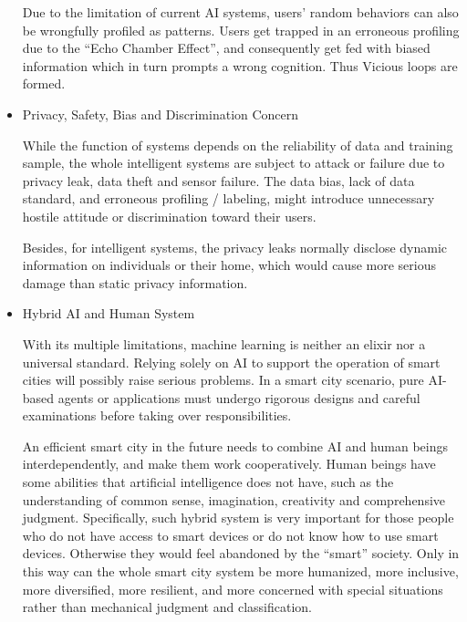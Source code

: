 \documentclass[letterpaper, twocolumn, 10pt, conference]{IEEEtran}
\begin{document}
\begin{itemize}
Due to the limitation of current AI systems, users’ random behaviors can also be wrongfully profiled as patterns. Users get trapped in an erroneous profiling due to the \enquote{Echo Chamber Effect}, and consequently get fed with biased information which in turn prompts a wrong cognition. Thus Vicious loops are formed. 
                        
\item Privacy, Safety, Bias and Discrimination Concern
                        
While the function of systems depends on the reliability of data and training sample, the whole intelligent systems are subject to attack or failure due to privacy leak, data theft and sensor failure. 
The data bias, lack of data standard, and erroneous profiling / labeling, might introduce unnecessary hostile attitude or discrimination toward their users. 

                        
Besides, for intelligent systems, the privacy leaks normally disclose dynamic information on individuals or their home, which would cause more serious damage than static privacy information. 
                        
\item Hybrid AI and Human System
                        
With its multiple limitations, machine learning is neither an elixir nor a universal standard. Relying solely on AI to support the operation of smart cities will possibly raise serious problems. 
In a smart city scenario, pure AI-based agents or applications must undergo rigorous designs and careful examinations before taking over responsibilities.

An efficient smart city in the future needs to combine AI and human beings interdependently, and make them work cooperatively. Human beings have some abilities that artificial intelligence does not have, such as the understanding of common sense, imagination, creativity and comprehensive judgment. 
Specifically, such hybrid system is very important for those people who do not have access to smart devices or do not know how to use smart devices. Otherwise they would feel abandoned by the \enquote{smart} society. 
Only in this way can the whole smart city system be more humanized, more inclusive, more diversified, more resilient, and more concerned with special situations rather than mechanical judgment and classification.                 

\end{itemize}
\end{document}
